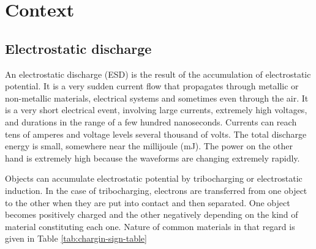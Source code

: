 \section{Context}
\subsection{Electrostatic discharge}

An electrostatic discharge (ESD) is the result of the accumulation of electrostatic potential.
It is a very sudden current flow that propagates through metallic or non-metallic materials, electrical systems and sometimes even through the air.
It is a very short electrical event, involving large currents, extremely high voltages, and durations in the range of a few hundred nanoseconds.
Currents can reach tens of amperes and voltage levels several thousand of volts.
The total discharge energy is small, somewhere near the millijoule (mJ).
The power on the other hand is extremely high because the waveforms are changing extremely rapidly.

Objects can accumulate electrostatic potential by tribocharging or electrostatic induction.
In the case of tribocharging, electrons are transferred from one object to the other when they are put into contact and then separated.
One object becomes positively charged and the other negatively depending on the kind of material constituting each one.
Nature of common materials in that regard is given in Table \ref{tab:chargin-sign-table}

